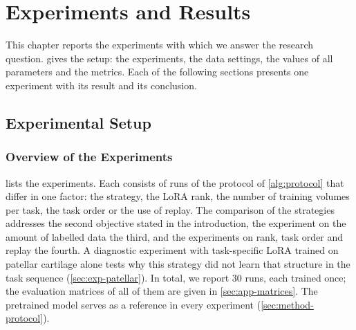 %

\chapter{Experiments and Results}
\label{chap:experiments}

This chapter reports the experiments with which we answer the research question.
 gives the setup: the experiments, the data settings, the values of all parameters and the metrics.
Each of the following sections presents one experiment with its result and its conclusion.

\section{Experimental Setup}
\label{sec:exp-setup}

\subsection{Overview of the Experiments}
\label{subsec:exp-overview}

 lists the experiments.
Each consists of runs of the protocol of \cref{alg:protocol} that differ in one factor: the strategy, the LoRA rank, the number of training volumes per task, the task order or the use of replay.
The comparison of the strategies addresses the second objective stated in the introduction, the experiment on the amount of labelled data the third, and the experiments on rank, task order and replay the fourth.
A diagnostic experiment with task-specific LoRA trained on patellar cartilage alone tests why this strategy did not learn that structure in the task sequence (\cref{sec:exp-patellar}).
In total, we report 30 runs, each trained once; the evaluation matrices of all of them are given in \cref{sec:app-matrices}.
The pretrained model serves as a reference in every experiment (\cref{sec:method-protocol}).

